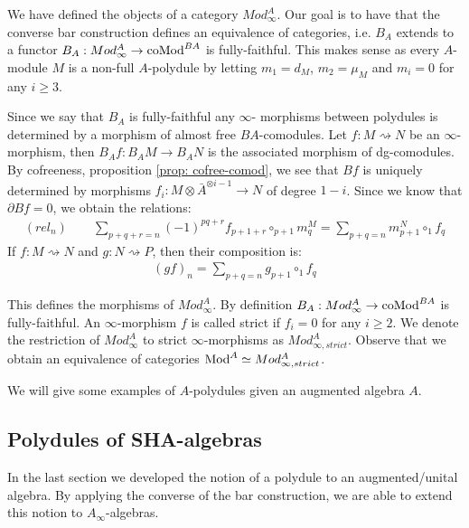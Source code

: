 \documentclass[../thesis.tex]{subfiles}
\begin{document}
            We have defined the objects of a category $Mod_\infty^A$. Our goal is to have that the converse bar construction defines an equivalence of categories, i.e. $B_A$ extends to a functor $B_A : Mod_\infty^A \rightarrow \tt{coMod}^{BA}$ is fully-faithful. This makes sense as every $A$-module $M$ is a non-full $A$-polydule by letting $m_1 = d_M$, $m_2 = \mu_M$ and $m_i = 0$ for any $i\geq 3$.

            Since we say that $B_A$ is fully-faithful any $\infty$- morphisms between polydules is determined by a morphism of almost free $BA$-comodules. Let $f : M \rightsquigarrow N$ be an $\infty$-morphism, then $B_Af : B_AM \rightarrow B_AN$ is the associated morphism of dg-comodules. By cofreeness, proposition \ref{prop: cofree-comod}, we see that $Bf$ is uniquely determined by morphisms $f_i : M \otimes \bar{A}^{\otimes i-1} \rightarrow N$ of degree $1-i$. Since we know that $\partial Bf = 0$, we obtain the relations:
            \begin{align*}
                (rel_n)\qquad \sum_{p+q+r = n} (-1)^{pq+r}f_{p+1+r} \circ_{p+1} m^M_{q} = \sum_{p+q = n} m^N_{p+1} \circ_1 f_q
            \end{align*}
            If $f : M \rightsquigarrow N$ and $g : N \rightsquigarrow P$, then their composition is:
            \begin{align*}
                (gf)_n = \sum_{p+q=n}g_{p+1}\circ_1 f_q
            \end{align*}

            This defines the morphisms of $Mod_\infty^A$. By definition $B_A: Mod_\infty^A \rightarrow \tt{coMod}^{BA}$ is fully-faithful. An $\infty$-morphism $f$ is called strict if $f_i = 0$ for any $i\geq 2$. We denote the restriction of $Mod_\infty^A$ to strict $\infty$-morphisms as $Mod_{\infty, strict}^A$. Observe that we obtain an equivalence of categories $\tt{Mod}^A \simeq Mod_{\infty, strict}^A$. 
            
            We will give some examples of $A$-polydules given an augmented algebra $A$.

        \subsection{Polydules of SHA-algebras}
            In the last section we developed the notion of a polydule to an augmented/unital algebra. By applying the converse of the bar construction, we are able to extend this notion to $A_\infty$-algebras.
\end{document}
